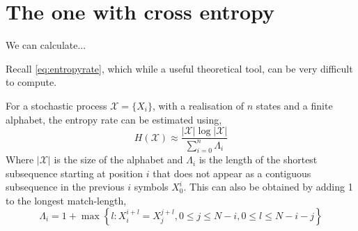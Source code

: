 \chapter{The one with cross entropy \label{ch:crossentropy}}


We can calculate...




Recall \autoref{eq:entropyrate}, which while a useful theoretical tool, can be very difficult to compute.


\begin{definition}
	For a stochastic process $\mathcal{X} = \{X_i\}$, with a realisation of $n$ states and a finite alphabet,  the entropy rate can be estimated using,
		\begin{equation}\label{eq:estimate}
	H(\mathcal{X}) \approx\frac{|\mathcal{X}| \log |\mathcal{X}| }{\sum_{i=0}^n \Lambda_{i} }
	\end{equation}
	Where $|\mathcal{X}|$ is the size of the alphabet and $\Lambda_{i}$ is the length of the shortest subsequence starting at position $i$ that does not appear as a contiguous subsequence in the previous $i$ symbols $X_{0}^{i}$. This can also be obtained by adding 1 to the longest match-length, 
	 \begin{equation}
	  \Lambda_{i}=1+\max \left\{l: X_{i}^{i+l}=X_{j}^{j+l}, 0 \leq j \leq N-i, 0 \leq l \leq N - i - j \right\}
	 \end{equation}
\end{definition}








